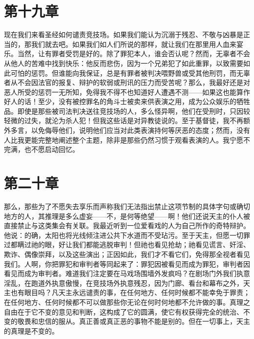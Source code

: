 
\section{第十九章}

现在我们来看圣经如何谴责竞技场。如果我们能认为沉溺于残忍、不敬与凶暴是正当的，那我们就去吧。如果我们如人们所说的那样，就让我们在那里用人血来宴乐。当然，让有罪者受罚是好的。除了罪犯本人，谁会否认呢？然而，无辜者不会从他人的苦难中找到快乐：他反而悲伤，因为一个兄弟犯了如此重罪，以致需要如此可怕的惩罚。但谁能向我保证，总是有罪者被判决喂野兽或受其他刑罚，而无辜者从不会因法官的报复、辩护的软弱或刑讯的压力而受苦呢？那么，我最好还是对恶人所受的惩罚一无所知，免得我不得不也知道好人遭遇不测——如果这也能算作好人的话！至少，没有被控罪名的角斗士被卖来供表演之用，成为公众娱乐的牺牲品。即使是那些被司法判决送往竞技场的人，多么怪异啊，他们在受刑时，只因较轻微的过失，就沦为杀人犯！但我这些话是对异教徒说的。至于基督徒，我不再额外多言，以免侮辱他们，说明他们应当对此类表演持何等厌恶的态度；然而，没有人比我更能完整地阐述整个主题，除非是那些仍然习惯于观看表演的人。我宁愿不完满，也不愿启动回忆。\par


\section{第二十章}

那么，那些为了不愿失去享乐而声称我们无法指出禁止这项节制的具体字句或确切地方的人，其推理是多么虚妄——不，是何等绝望——啊！他们还说天主的仆人被直接禁止与这类集会有关联。我最近听到一位爱看戏的人为自己所作的奇特辩护。他说：的确，太阳也将光线倾注进公共下水道而不受玷污。至于天主，但愿一切罪过都瞒过祂的眼，好让我们都能逃脱审判！但祂也看见抢劫；祂看见谎言、奸淫、欺诈、偶像崇拜，以及这些演出；正因如此，我们才不看它们，免得那全视者看见我们。人啊，你把罪犯和审判者等同起来了：罪犯因被看见而成为罪犯，审判者因看见而成为审判者。难道我们注定要在马戏场围墙外发疯吗？在剧场门外我们执意淫乱，在跑道外执意傲慢，在竞技场外执意残忍，因为门廊、看台和幕布之外，天主也有眼目吗？凡天主永远谴责的事，在任何地方、任何时候都不能幸免于罪责；在任何地方、任何时候都不可以做那些你无论在何时何地都不允许做的事。真理之自由在于它不变的意见和判断，这构成了它的圆满，使它有权获得完全的统治、不变的敬畏和忠信的服从。真正善或真正恶的事物不能是别的。但在一切事上，天主的真理是不变的。\par

